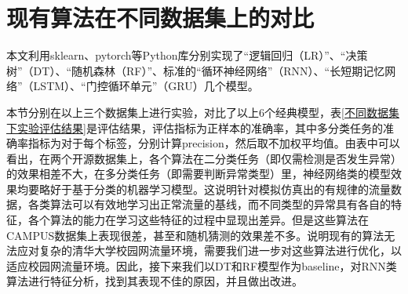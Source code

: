 




\section{现有算法在不同数据集上的对比}
本文利用sklearn、pytorch等Python库分别实现了“逻辑回归（LR）”、“决策树”（DT）、“随机森林（RF）”、标准的“循环神经网络”（RNN）、“长短期记忆网络”（LSTM）、“门控循环单元”（GRU）几个模型。

本节分别在以上三个数据集上进行实验，对比了以上6个经典模型，表\ref{不同数据集下实验评估结果}是评估结果，评估指标为正样本的准确率，其中多分类任务的准确率指标为对于每个标签，分别计算precision，然后取不加权平均值。由表中可以看出，在两个开源数据集上，各个算法在二分类任务（即仅需检测是否发生异常）的效果相差不大，在多分类任务（即需要判断异常类型）里，神经网络类的模型效果均要略好于基于分类的机器学习模型。这说明针对模拟仿真出的有规律的流量数据，各类算法可以有效地学习出正常流量的基线，而不同类型的异常具有各自的特征，各个算法的能力在学习这些特征的过程中显现出差异。但是这些算法在CAMPUS数据集上表现很差，甚至和随机猜测的效果差不多。说明现有的算法无法应对复杂的清华大学校园网流量环境，需要我们进一步对这些算法进行优化，以适应校园网流量环境。因此，接下来我们以DT和RF模型作为baseline，对RNN类算法进行特征分析，找到其表现不佳的原因，并且做出改进。




